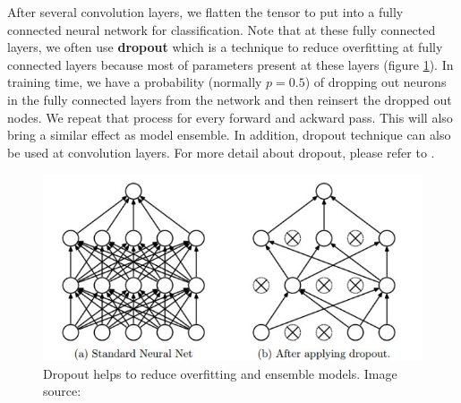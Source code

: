 After several convolution layers, we flatten the tensor to put into a fully connected neural network for classification. Note that at these fully connected layers, we often use \textbf{dropout} which is a technique to reduce overfitting at fully connected layers because most of parameters present at these layers (figure \ref{fig:dropout}). In training time, we have a probability (normally $p=0.5$) of dropping out neurons in the fully connected layers from the network and then reinsert the dropped out nodes. We repeat that process for every forward and ackward pass. This will also bring a similar effect as model ensemble. In addition, dropout technique can also be used at convolution layers. For more detail about dropout, please refer to \cite{Srivastava:2014:DSW:2627435.2670313}.
\begin{figure}[tb]
	\centering
	\includegraphics[width=0.8\hsize]{./figures/dropout}
	\caption{Dropout helps to reduce overfitting and ensemble models. Image source: \cite{Srivastava:2014:DSW:2627435.2670313}}
	\label{fig:dropout}
\end{figure}


